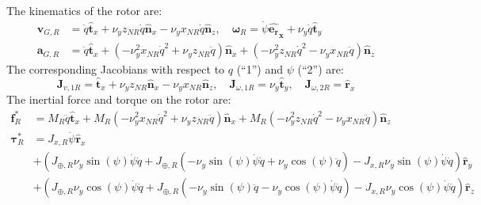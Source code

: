 \documentclass[wes, manuscript]{copernicus}
\renewcommand{\v}[1]{\boldsymbol{#1}}
\begin{document}
The kinematics of the rotor are:
\begin{align}
\v{v}_{G,R} &=
 \dot{q}\v{\hat{t}}_x + \nu_y z_{NR} \dot{q}\v{\hat{n}}_x -  \nu_y x_{NR} \dot{q}\v{\hat{n}}_z
 ,\quad
\v{\omega}_R = \dot{\psi}\mathbf{\hat{e_r}_x} + \nu_y \dot{q}\v{\hat{t}}_y
\\
 \v{a}_{G,R} &= 
 \ddot{q}\v{\hat{t}}_x + (- \nu_y^{2} x_{NR} \dot{q}^{2} + \nu_y z_{NR} \ddot{q})\v{\hat{n}}_x + (- \nu_y^{2} z_{NR} \dot{q}^{2} - \nu_y x_{NR} \ddot{q})\v{\hat{n}}_z
\end{align}
The corresponding Jacobians with respect to $q$ (``1'') and $\psi$ (``2'') are:
\begin{equation*}
\v{J}_{v,1R}=\v{\hat{t}}_x + \nu_y z_{NR}\v{\hat{n}}_x -  \nu_y x_{NR}\v{\hat{n}}_z
,\quad
\v{J}_{\omega,1R}=\nu_y\v{\hat{t}}_y
,\quad
\v{J}_{\omega,2R}=\v{\hat{r}}_x
% 
\end{equation*}
The inertial force and torque on the rotor are:
\begin{align}
\v{f}^*_R &= 
M_{R}  \ddot{q}\v{\hat{t}}_x + M_{R} \left(- \nu_y^{2} x_{NR} \dot{q}^{2} + \nu_y z_{NR} \ddot{q}\right)\v{\hat{n}}_x + M_{R} \left(- \nu_y^{2} z_{NR} \dot{q}^{2} - \nu_y x_{NR} \ddot{q}\right)\v{\hat{n}}_z
\\
\v{\tau}^*_R &= 
J_{x,R} \ddot{\psi}\v{\hat{r}}_x \\
&+ (J_{\oplus,R} \nu_y \sin\left(\psi\right) \dot{\psi} \dot{q} + J_{\oplus,R} \left(- \nu_y \sin\left(\psi\right) \dot{\psi} \dot{q} + \nu_y \cos\left(\psi\right) \ddot{q}\right) 
   - J_{x,R} \nu_y \sin\left(\psi\right) \dot{\psi} \dot{q})\v{\hat{r}}_y 
\\
&+ (J_{\oplus,R} \nu_y \cos\left(\psi\right) \dot{\psi} \dot{q}
+ J_{\oplus,R} \left(- \nu_y \sin\left(\psi\right) \ddot{q} - \nu_y \cos\left(\psi\right) \dot{\psi} \dot{q}\right) - J_{x,R} \nu_y \cos\left(\psi\right) \dot{\psi} \dot{q})\v{\hat{r}}_z
\end{align}
\end{document}
